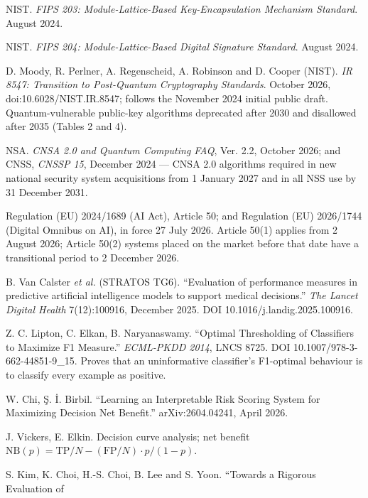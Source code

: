\documentclass[11pt,a4paper]{article}
\begin{document}
\begin{small}
\begin{enumerate}[label={[\arabic*]},leftmargin=*,itemsep=1.5pt]
  \item NIST. \emph{FIPS 203: Module-Lattice-Based Key-Encapsulation Mechanism Standard}. August 2024.
  \item NIST. \emph{FIPS 204: Module-Lattice-Based Digital Signature Standard}. August 2024.
  \item D. Moody, R. Perlner, A. Regenscheid, A. Robinson and D. Cooper (NIST). \emph{IR 8547:
        Transition to Post-Quantum Cryptography Standards}. October 2026, doi:10.6028/NIST.IR.8547;
        follows the November 2024 initial public draft. Quantum-vulnerable public-key algorithms
        deprecated after 2030 and disallowed after 2035 (Tables 2 and 4).
  \item NSA. \emph{CNSA 2.0 and Quantum Computing FAQ}, Ver. 2.2, October 2026; and CNSS,
        \emph{CNSSP 15}, December 2024 --- CNSA 2.0 algorithms required in new national security
        system acquisitions from 1 January 2027 and in all NSS use by 31 December 2031.
  \item Regulation (EU) 2024/1689 (AI Act), Article 50; and Regulation (EU) 2026/1744 (Digital
        Omnibus on AI), in force 27 July 2026. Article 50(1) applies from 2 August 2026; Article
        50(2) systems placed on the market before that date have a transitional period to
        2 December 2026.
  \item B. Van Calster \emph{et al.} (STRATOS TG6). ``Evaluation of performance measures in
        predictive artificial intelligence models to support medical decisions.''
        \emph{The Lancet Digital Health} 7(12):100916, December 2025.
        DOI 10.1016/j.landig.2025.100916.
  \item Z. C. Lipton, C. Elkan, B. Naryanaswamy. ``Optimal Thresholding of Classifiers to Maximize F1
        Measure.'' \emph{ECML-PKDD 2014}, LNCS 8725. DOI 10.1007/978-3-662-44851-9\_15.
        Proves that an uninformative classifier's F1-optimal behaviour is to classify every example
        as positive.
  \item W. Chi, \c{S}. \.I. Birbil. ``Learning an Interpretable Risk Scoring System for Maximizing
        Decision Net Benefit.'' arXiv:2604.04241, April 2026.
  \item J. Vickers, E. Elkin. Decision curve analysis; net benefit
        $\mathrm{NB}(p) = \mathrm{TP}/N - (\mathrm{FP}/N)\cdot p/(1-p)$.
  \item S. Kim, K. Choi, H.-S. Choi, B. Lee and S. Yoon. ``Towards a Rigorous Evaluation of

\end{enumerate}
\end{small}
\end{document}
